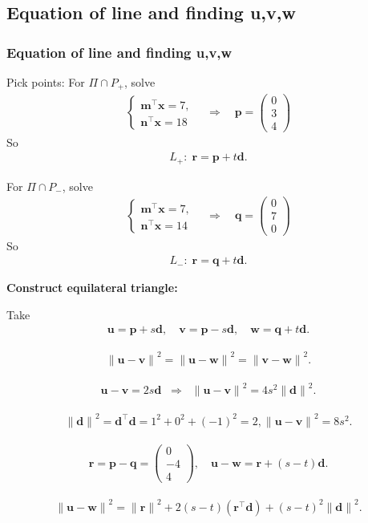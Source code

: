 \documentclass{beamer}
\theoremstyle{remark}
\providecommand{\norm}[1]{\lVert#1\rVert}
\newcommand{\myvec}[1]{\ensuremath{\begin{pmatrix}#1\end{pmatrix}}}
\let\vec\mathbf
\numberwithin{equation}{section}
\begin{document}
\subsection{Equation of line and finding u,v,w}
\begin{frame}
\frametitle{Equation of line and finding u,v,w}
Pick points:  
For $\Pi\cap P_+$, solve
\begin{align}
\begin{cases}
\vec{m}^\top \vec{x} = 7,\\
\vec{n}^\top \vec{x} = 18
\end{cases}
\quad\Longrightarrow\quad  \vec{p} = \myvec{0\\3\\4}
\end{align}
So
\begin{align}
L_+:\; \vec{r}=\vec{p} + t\vec{d}.
\end{align}

For $\Pi\cap P_-$, solve
\begin{align}
\begin{cases}
\vec{m}^\top \vec{x}= 7,\\
\vec{n}^\top \vec{x}= 14
\end{cases}
\quad\Longrightarrow\quad  \vec{q} = \myvec{0\\7\\0}
\end{align}
So
\begin{align}
L_-:\; \vec{r}=\vec{q} +t\vec{d}.
\end{align}

\textbf{Construct equilateral triangle:}
\end{frame}
\begin{frame}
Take
\begin{align}
\vec{u}=\vec{p}+s\vec{d},\quad \vec{v}=\vec{p}-s\vec{d},\quad \vec{w}=\vec{q}+t\vec{d}.
\end{align}

\begin{align}
{\norm{\vec{u}-\vec{v}}}^2={\norm{\vec{u}-\vec{w}}}^2={\norm{\vec{v}-\vec{w}}}^2.
\end{align}

\begin{align}
\vec{u}-\vec{v}=2s\vec{d} \;\;\Rightarrow\;\; {\norm{\vec{u}-\vec{v}}}^2=4s^2{\norm{\vec{d}}}^2.
\end{align}

\begin{align}
{\norm{\vec{d}}}^2=\vec{d}^\top\vec{d}=1^2+0^2+(-1)^2=2,
{\norm{\vec{u}-\vec{v}}}^2=8s^2.
\end{align}

\begin{align}
\vec{r}=\vec{p}-\vec{q}=\myvec{0\\-4\\4},\quad
\vec{u}-\vec{w}=\vec{r}+(s-t)\vec{d}.
\end{align}

\begin{align}
{\norm{\vec{u}-\vec{w}}}^2={\norm{\vec{r}}}^2+2(s-t)(\vec{r}^\top\vec{d})
+(s-t)^2{\norm{\vec{d}}}^2.
\end{align}
\end{frame}
\end{document}
